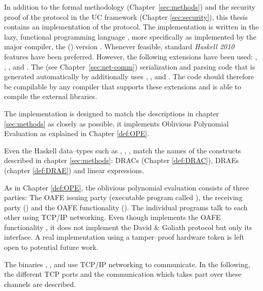 \label{sec:implementation}

In addition to the formal methodology (Chapter~\ref{sec:methods}) and the
security proof of the protocol in the UC framework (Chapter \ref{sec:security}),
this thesis contains an implementation of the protocol. The implementation is
written in the lazy, functional programming language \JWTLhaskell{}, more
specifically \JWThaskell{} as implemented by the major \JWThaskell{} compiler,
the \JWTXLghc{} (\JWTghc{}) version \JWTVghc{}. Whenever feasible, standard
\emph{Haskell 2010} \cite{haskell2010} features have been preferred. However,
the following extensions have been used: ,
, , and
.  The \JWTprotobuf{} (see
Chapter~\ref{sec:net-comm}) serialization and parsing code that is generated
automatically by \JWTLhprotoc{} additionally uses
, , and
. The code should therefore be compilable
by any \JWThaskell{} compiler that supports these extensions and is able to
compile the external libraries.

The implementation is designed to match the descriptions in chapter
\ref{sec:methods} as closely as possible, it implements Oblivious Polynomial
Evaluation as explained in Chapter \ref{def:OPE}.

Even the Haskell data--types such as , , ,
 match the names of the constructs described in chapter
\ref{sec:methods}: DRACs (Chapter \ref{def:DRAC}), DRAEs (chapter
\ref{def:DRAE}) and linear expressions.

As in Chapter \ref{def:OPE}, the oblivious polynomial evaluation consists of
three parties: The OAFE issuing party \JWpOne{} (executable program called
\JWBpOne{}), the receiving party \JWpTwo{} (\JWBpTwo{}) and the OAFE
functionality (\JWBtoken{}). The individual programs talk to each other using
TCP/IP networking. Even though \JWBtoken{} implements the OAFE functionality
\JWfuncSymOAFE{}, it does not implement the David \& Goliath protocol
\cite{davidgoliath} but only its interface. A real implementation using a
tamper--proof hardware token is left open to potential future work.


%
%
\label{sec:communication-channels}

The binaries \JWBpOne{}, \JWBpTwo{}, and \JWBtoken{} use TCP/IP networking to
communicate. In the following, the different TCP ports and the communication
which takes part over these channels are described.


